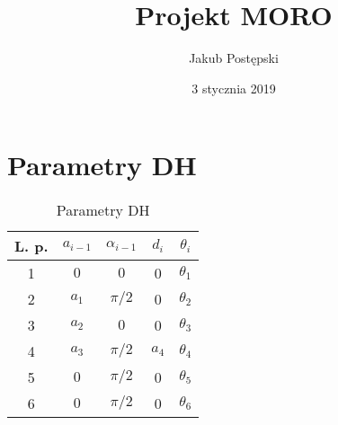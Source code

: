 \documentclass[]{article}
\title{Projekt MORO}
\author{Jakub Postępski}
\date{3 stycznia 2019}
\begin{document}
\maketitle


\section{Parametry DH}

\begin{table}[H]
	\begin{tabular}{|| c | c c c c ||}
		\hline
		L. p. & $a_{i-1}$ & $\alpha_{i-1}$ & $d_i$ & $\theta_i$ \\ 
		\hline\hline
		1 & $ 0 $ & $0$ & 0 & $\theta_1$ \\
		\hline
		2 & $a_1$ & $\pi/2$ & 0 & $\theta_2$ \\
		\hline
		3 & $a_2$ & $0$ & 0 & $\theta_3$ \\
		\hline
		4 & $a_3$ & $\pi/2$ & $a_4$ & $\theta_4$ \\
		\hline
		5 & $0$ & $\pi/2$ & 0 & $\theta_5$ \\
		\hline
		6 & $0$ & $\pi/2$ & 0 & $\theta_6$ \\
		\hline
		
		
		
	\end{tabular}
	\caption{Parametry DH}
	\label{tab1}
\end{table}
\end{document}
